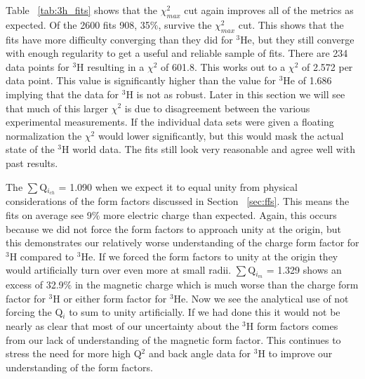 Table ~\ref{tab:3h_fits} shows that the $\chi^2_{max}$ cut again improves all of the metrics as expected. Of the 2600 fits 908, 35$\%$, survive the $\chi^2_{max}$ cut. This shows that the fits have more difficulty converging than they did for $^3$He, but they still converge with enough regularity to get a useful and reliable sample of fits. There are 234 data points for $^3$H resulting in a $\chi^2$ of 601.8. This works out to a $\chi^2$ of 2.572 per data point. This value is significantly higher than the value for $^3$He of 1.686 implying that the data for $^3$H is not as robust. Later in this section we will see that much of this larger $\chi^2$ is due to disagreement between the various experimental measurements. If the individual data sets were given a floating normalization the $\chi^2$ would lower significantly, but this would mask the actual state of the $^3$H world data. The fits still look very reasonable and agree well with past results.%

The $\sum$Q$_{i_{ch}}$ = 1.090 when we expect it to equal unity from physical considerations of the form factors discussed in Section ~\ref{sec:ffs}. This means the fits on average see 9$\%$ more electric charge than expected. Again, this occurs because we did not force the form factors to approach unity at the origin, but this demonstrates our relatively worse understanding of the charge form factor for $^3$H compared to $^3$He. If we forced the form factors to unity at the origin they would artificially turn over even more at small radii. $\sum$Q$_{i_{m}}$ = 1.329 shows an excess of 32.9$\%$ in the magnetic charge which is much worse than the charge form factor for $^3$H or either form factor for $^3$He. Now we see the analytical use of not forcing the Q$_i$ to sum to unity artificially. If we had done this it would not be nearly as clear that most of our uncertainty about the $^3$H form factors comes from our lack of understanding of the magnetic form factor. This continues to stress the need for more high Q$^2$ and back angle data for $^3$H to improve our understanding of the form factors.%

